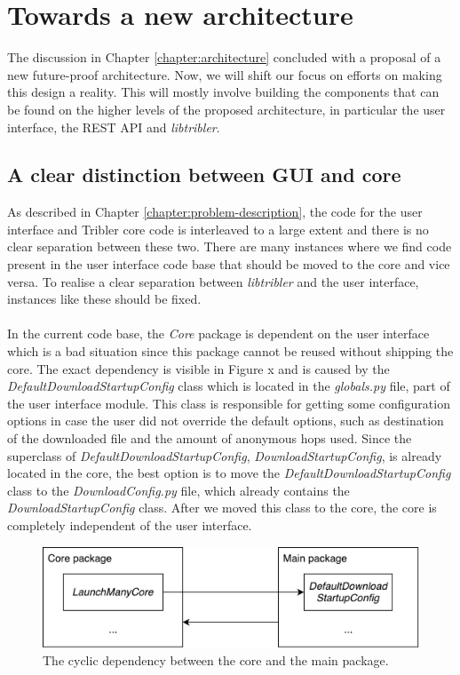 \chapter{Towards a new architecture}
\label{chapter:towards_new_architecture}
The discussion in Chapter \ref{chapter:architecture} concluded with a proposal of a new future-proof architecture. Now, we will shift our focus on efforts on making this design a reality. This will mostly involve building the components that can be found on the higher levels of the proposed architecture, in particular the user interface, the REST API and \emph{libtribler}.

\section{A clear distinction between GUI and core}
As described in Chapter \ref{chapter:problem-description}, the code for the user interface and Tribler core code is interleaved to a large extent and there is no clear separation between these two. There are many instances where we find code present in the user interface code base that should be moved to the core and vice versa. To realise a clear separation between \emph{libtribler} and the user interface, instances like these should be fixed.\\\\
In the current code base, the \emph{Core} package is dependent on the user interface which is a bad situation since this package cannot be reused without shipping the core. The exact dependency is visible in Figure x and is caused by the \emph{DefaultDownloadStartupConfig} class which is located in the \emph{globals.py} file, part of the user interface module. This class is responsible for getting some configuration options in case the user did not override the default options, such as destination of the downloaded file and the amount of anonymous hops used. Since the superclass of \emph{DefaultDownloadStartupConfig}, \emph{DownloadStartupConfig}, is already located in the core, the best option is to move the \emph{DefaultDownloadStartupConfig} class to the \emph{DownloadConfig.py} file, which already contains the \emph{DownloadStartupConfig} class. After we moved this class to the core, the core is completely independent of the user interface.

\begin{figure}[h!]
	\centering
	\includegraphics[width=0.6\columnwidth]{images/implementation/cycle_main_core}
	\caption{The cyclic dependency between the core and the main package.}
	\label{fig:cycle-main-core}
\end{figure}

